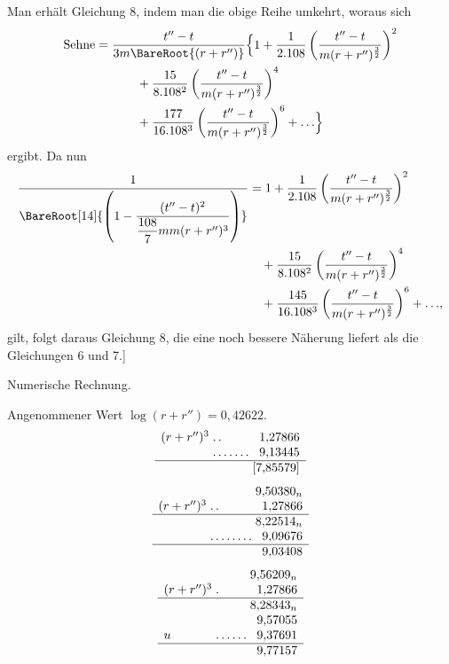 Man erhält Gleichung 8, indem man die obige Reihe umkehrt, woraus sich
\[
\begin{aligned}
\text{Sehne}={}&\frac{t''-t}{3m\BareRoot{(r+r'')}}\Bigl\{1+\frac{1}{2\mathord{.}108}\left(\frac{t''-t}{m(r+r'')^{\frac{3}{2}}}\right)^2\\
&\qquad{}+\frac{15}{8\mathord{.}108^2}\left(\frac{t''-t}{m(r+r'')^{\frac{3}{2}}}\right)^4\\
&\qquad{}+\frac{177}{16\mathord{.}108^3}\left(\frac{t''-t}{m(r+r'')^{\frac{3}{2}}}\right)^6+\mathord{.}\,\mathord{.}\,\mathord{.}\Bigr\}
\end{aligned}
\]
ergibt. Da nun
\[
\begin{aligned}
\frac{1}{\BareRoot[14]{\left(1-\dfrac{(t''-t)^2}{\dfrac{108}{7}mm(r+r'')^3}\right)}}
&=1+\frac{1}{2\mathord{.}108}\left(\frac{t''-t}{m(r+r'')^{\frac{3}{2}}}\right)^2\\
&\quad{}+\frac{15}{8\mathord{.}108^2}\left(\frac{t''-t}{m(r+r'')^{\frac{3}{2}}}\right)^4\\
&\quad{}+\frac{145}{16\mathord{.}108^3}\left(\frac{t''-t}{m(r+r'')^{\frac{3}{2}}}\right)^6+\mathord{.}\,\mathord{.}\,\mathord{.},
\end{aligned}
\]
gilt, folgt daraus Gleichung 8, die eine noch bessere Näherung liefert als die Gleichungen 6 und 7.]
\begin{center}Numerische Rechnung.\end{center}
Angenommener Wert \(\log(r+r'')=0{,}42622\).
\[
\begin{array}{l@{\;}l@{\;}r}
(r+r'')^3&\mathord{.}\,\mathord{.}&1{,}27866\\
&\mathord{.}\,\mathord{.}\,\mathord{.}\,\mathord{.}\,\mathord{.}\,\mathord{.}\,\mathord{.}&9{,}13445\\\hline
&&[7{,}85579]
\end{array}
\]
\[
\begin{array}{l@{\;}l@{\;}r}
&&9{,}50380_n\\
(r+r'')^3&\mathord{.}\,\mathord{.}&1{,}27866\\\hline
&&8{,}22514_n\\
&\mathord{.}\,\mathord{.}\,\mathord{.}\,\mathord{.}\,\mathord{.}\,\mathord{.}\,\mathord{.}\,\mathord{.}&9{,}09676\\\hline
&&9{,}03408
\end{array}
\]
\[
\begin{array}{l@{\;}l@{\;}r}
&&9{,}56209_n\\
(r+r'')^3&\mathord{.}&1{,}27866\\\hline
&&8{,}28343_n\\
&&9{,}57055\\
u&\mathord{.}\,\mathord{.}\,\mathord{.}\,\mathord{.}\,\mathord{.}\,\mathord{.}&9{,}37691\\\hline
&&9{,}77157
\end{array}
\]
